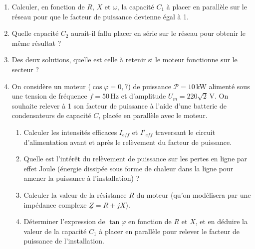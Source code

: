 \begin{enumerate}
\item Calculer, en fonction de $R$, $X$ et $\omega$, la capacité $C_1$ à placer en parallèle sur le réseau pour que le facteur de puissance devienne égal à 1.
\item Quelle capacité $C_2$ aurait-il fallu placer en série sur le réseau pour obtenir le même résultat ?
\item Des deux solutions, quelle est celle à retenir si le moteur fonctionne sur le secteur ?
\item On considère un moteur ($\cos\varphi = 0,7$) de puissance $\mathcal{P} = 10\,$kW alimenté sous une tension de fréquence $f = 50\,$Hz et d’amplitude $U_m = 220\sqrt{2}\,$V. On souhaite relever à 1 son facteur de puissance à l’aide d’une batterie de condensateurs de capacité $C$, placée en parallèle avec le moteur.
\begin{enumerate}
\item  Calculer les intensités efficaces $I_{eff}$ et $I'_{eff}$ traversant le circuit d’alimentation avant et après le relèvement du facteur de puissance.
\item  Quelle est l’intérêt du relèvement de puissance sur les pertes en ligne par effet Joule (énergie dissipée sous forme de chaleur dans la ligne pour amener la puissance à l’installation) ?
\item  Calculer la valeur de la résistance $R$ du moteur (qu’on modélisera par une impédance complexe $\underline{Z} = R + jX$).
\item  Déterminer l’expression de $\tan\varphi$ en fonction de $R$ et $X$, et en déduire la valeur de la capacité $C_1$ à placer en parallèle pour relever le facteur de puissance de l’installation.
\end{enumerate}
\end{enumerate}

 
